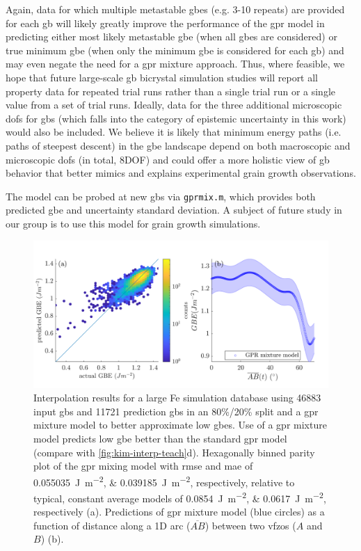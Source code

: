 \documentclass[final,twocolumn,12pt]{elsarticle}
\newcommand{\inpt}{input}
\newcommand{\outpt}{prediction}
\begin{document}
{Again, data for which multiple metastable \glspl{gbe} (e.g. 3-10 repeats) are provided for each \gls{gb} will likely greatly improve the performance of the \gls{gpr} model in predicting either most likely metastable \gls{gbe} (when all \glspl{gbe} are considered) or true minimum \gls{gbe} (when only the minimum \gls{gbe} is considered for each \gls{gb}) and may even negate the need for a \gls{gpr} mixture approach. Thus, where feasible, we hope that future large-scale \gls{gb} bicrystal simulation studies will report all property data for repeated trial runs rather than a single trial run or a single value from a set of trial runs. Ideally, data for the three additional microscopic \glspl{dof} for \glspl{gb} (which falls into the category of epistemic uncertainty in this work) would also be included. We believe it is likely that minimum energy paths (i.e. paths of steepest descent) in the \gls{gbe} landscape depend on both macroscopic and microscopic \glspl{dof} (in total, 8DOF) and could offer a more holistic view of \gls{gb} behavior that better mimics and explains experimental grain growth observations.

The model can be probed at new \glspl{gb} via \texttt{gprmix.m}, which provides both predicted \gls{gbe} and uncertainty standard deviation. A subject of future study in our group is to use this model for grain growth simulations.

\begin{figure}
    \centering
    \includegraphics{kim-interp.png}
    \caption{Interpolation results for a large Fe simulation database \cite{kimPhasefieldModeling3D2014} using \num{46883} \inpt{} \glspl{gb} and \num{11721} \outpt{} \glspl{gb} in an 80\%/20\% split and a \gls{gpr} mixture model to better approximate low \glspl{gbe}. Use of a \gls{gpr} mixture model predicts low \gls{gbe} better than the standard \gls{gpr} model (compare with \cref{fig:kim-interp-teach}d). Hexagonally binned parity plot of the \gls{gpr} mixing model with \gls{rmse} and \gls{mae} of \SIlist{0.055035;0.039185}{\J\per\square\meter}, respectively, relative to typical, constant average models of \SIlist{0.0854;0.0617}{\joule\per\square\meter}, respectively (a). Predictions of \gls{gpr} mixture model (blue circles) as a function of distance along a 1D arc ($\overline{AB}$) between two \glspl{vfzo} ($A$ and $B$) (b). }
    \label{fig:kim-interp}
\end{figure}

}
\end{document}
